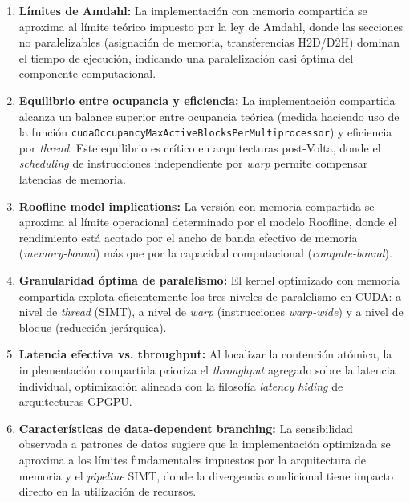         \begin{enumerate}
        
            \item \textbf{Límites de Amdahl:} La implementación con memoria compartida se aproxima al límite teórico impuesto por la ley de Amdahl, donde las secciones no paralelizables (asignación de memoria, transferencias H2D/D2H) dominan el tiempo de ejecución, indicando una paralelización casi óptima del componente computacional.
            
            \item \textbf{Equilibrio entre ocupancia y eficiencia:} La implementación compartida alcanza un balance superior entre ocupancia teórica (medida haciendo uso de la función \texttt{cudaOccupancyMaxActiveBlocksPerMultiprocessor}) y eficiencia por \textit{thread}. Este equilibrio es crítico en arquitecturas post-Volta, donde el \textit{scheduling} de instrucciones independiente por \textit{warp} permite compensar latencias de memoria.
            
            \item \textbf{Roofline model implications:} La versión con memoria compartida se aproxima al límite operacional determinado por el modelo Roofline, donde el rendimiento está acotado por el ancho de banda efectivo de memoria (\textit{memory-bound}) más que por la capacidad computacional (\textit{compute-bound}).
            
            \item \textbf{Granularidad óptima de paralelismo:} El kernel optimizado con memoria compartida explota eficientemente los tres niveles de paralelismo en CUDA: a nivel de \textit{thread} (SIMT), a nivel de \textit{warp} (instrucciones \textit{warp-wide}) y a nivel de bloque (reducción jerárquica).
            
            \item \textbf{Latencia efectiva vs. throughput:} Al localizar la contención atómica, la implementación compartida prioriza el \textit{throughput} agregado sobre la latencia individual, optimización alineada con la filosofía \textit{latency hiding} de arquitecturas GPGPU.
            
            \item \textbf{Características de data-dependent branching:} La sensibilidad observada a patrones de datos sugiere que la implementación optimizada se aproxima a los límites fundamentales impuestos por la arquitectura de memoria y el \textit{pipeline} SIMT, donde la divergencia condicional tiene impacto directo en la utilización de recursos.
            
        \end{enumerate}
        
